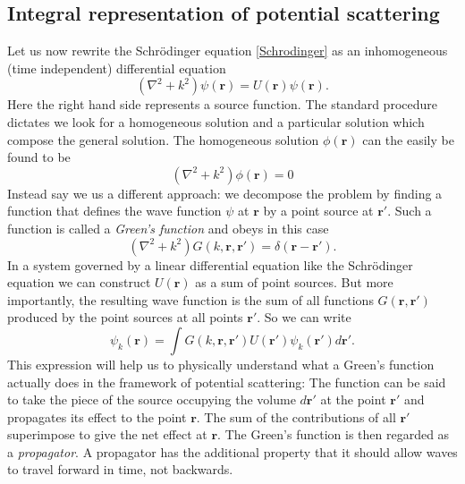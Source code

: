 \documentclass[11pt]{article}
\numberwithin{equation}{section}
\begin{document}
\subsection{Integral representation of potential scattering}\label{sec:IntegralRep}
Let us now rewrite the Schr\"odinger equation \eqref{Schrodinger} as an inhomogeneous (time independent) differential equation
\begin{equation}\label{inhomogeneous}
(\nabla^2 + k^2)\psi(\mathbf{r}) = U(\mathbf{r})\psi(\mathbf{r}).	
\end{equation}
Here the right hand side represents a source function.
The standard procedure dictates we look for a homogeneous solution and a particular solution which compose the general solution. The homogeneous solution $\phi(\mathbf{r})$ can the easily be found to be
\begin{equation}
(\nabla^2 + k^2)\phi(\mathbf{r}) = 0
\end{equation}
Instead say we us a different approach: we decompose the problem by finding a function that defines the wave function $\psi$ at $\mathbf{r}$ by a point source at $\mathbf{r}'$. Such a function is called a \emph{Green's function} and obeys in this case
\begin{equation}\label{Green's}
(\nabla^2 + k^2)G(k,\mathbf{r},\mathbf{r}') = \delta(\mathbf{r}-\mathbf{r}').	
\end{equation}
 In a system governed by a linear differential equation like the Schr\"odinger equation we can construct $U(\mathbf{r})$ as a sum of point sources. But more importantly, the resulting wave function is the sum of all functions $G(\mathbf{r},\mathbf{r}')$ produced by the point sources at all points $\mathbf{r}'$. So we can write
 \begin{equation}\label{Propagator}
 	\psi_k(\mathbf{r}) = \int  G(k,\mathbf{r},\mathbf{r'})U(\mathbf{r}')\psi_k(\mathbf{r}')d\mathbf{r}'.
 \end{equation}
 This expression will help us to physically understand what a Green's function actually does in the framework of potential scattering: The function can be said to take the piece of the source occupying the volume $d\mathbf{r}'$ at the point $\mathbf{r}'$ and propagates its effect to the point $\mathbf{r}$. The sum of the contributions of all $\mathbf{r}'$ superimpose to give the net effect at $\mathbf{r}$. The Green's function is then regarded as a \emph{propagator}. A propagator has the additional property that it should allow waves to travel forward in time, not backwards.\\ \\
\end{document}
